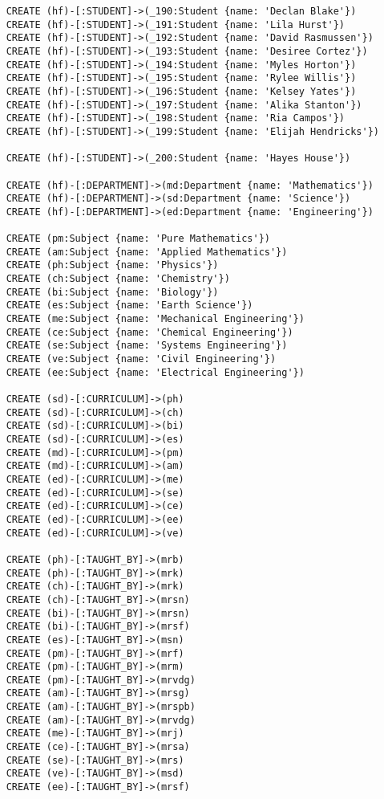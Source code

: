 \begin{lstlisting}
	CREATE (hf)-[:STUDENT]->(_190:Student {name: 'Declan Blake'})
	CREATE (hf)-[:STUDENT]->(_191:Student {name: 'Lila Hurst'})
	CREATE (hf)-[:STUDENT]->(_192:Student {name: 'David Rasmussen'})
	CREATE (hf)-[:STUDENT]->(_193:Student {name: 'Desiree Cortez'})
	CREATE (hf)-[:STUDENT]->(_194:Student {name: 'Myles Horton'})
	CREATE (hf)-[:STUDENT]->(_195:Student {name: 'Rylee Willis'})
	CREATE (hf)-[:STUDENT]->(_196:Student {name: 'Kelsey Yates'})
	CREATE (hf)-[:STUDENT]->(_197:Student {name: 'Alika Stanton'})
	CREATE (hf)-[:STUDENT]->(_198:Student {name: 'Ria Campos'})
	CREATE (hf)-[:STUDENT]->(_199:Student {name: 'Elijah Hendricks'})
	
	CREATE (hf)-[:STUDENT]->(_200:Student {name: 'Hayes House'})
	
	CREATE (hf)-[:DEPARTMENT]->(md:Department {name: 'Mathematics'})
	CREATE (hf)-[:DEPARTMENT]->(sd:Department {name: 'Science'})
	CREATE (hf)-[:DEPARTMENT]->(ed:Department {name: 'Engineering'})
	
	CREATE (pm:Subject {name: 'Pure Mathematics'})
	CREATE (am:Subject {name: 'Applied Mathematics'})
	CREATE (ph:Subject {name: 'Physics'})
	CREATE (ch:Subject {name: 'Chemistry'})
	CREATE (bi:Subject {name: 'Biology'})
	CREATE (es:Subject {name: 'Earth Science'})
	CREATE (me:Subject {name: 'Mechanical Engineering'})
	CREATE (ce:Subject {name: 'Chemical Engineering'})
	CREATE (se:Subject {name: 'Systems Engineering'})
	CREATE (ve:Subject {name: 'Civil Engineering'})
	CREATE (ee:Subject {name: 'Electrical Engineering'})
	
	CREATE (sd)-[:CURRICULUM]->(ph)
	CREATE (sd)-[:CURRICULUM]->(ch)
	CREATE (sd)-[:CURRICULUM]->(bi)
	CREATE (sd)-[:CURRICULUM]->(es)
	CREATE (md)-[:CURRICULUM]->(pm)
	CREATE (md)-[:CURRICULUM]->(am)
	CREATE (ed)-[:CURRICULUM]->(me)
	CREATE (ed)-[:CURRICULUM]->(se)
	CREATE (ed)-[:CURRICULUM]->(ce)
	CREATE (ed)-[:CURRICULUM]->(ee)
	CREATE (ed)-[:CURRICULUM]->(ve)
	
	CREATE (ph)-[:TAUGHT_BY]->(mrb)
	CREATE (ph)-[:TAUGHT_BY]->(mrk)
	CREATE (ch)-[:TAUGHT_BY]->(mrk)
	CREATE (ch)-[:TAUGHT_BY]->(mrsn)
	CREATE (bi)-[:TAUGHT_BY]->(mrsn)
	CREATE (bi)-[:TAUGHT_BY]->(mrsf)
	CREATE (es)-[:TAUGHT_BY]->(msn)
	CREATE (pm)-[:TAUGHT_BY]->(mrf)
	CREATE (pm)-[:TAUGHT_BY]->(mrm)
	CREATE (pm)-[:TAUGHT_BY]->(mrvdg)
	CREATE (am)-[:TAUGHT_BY]->(mrsg)
	CREATE (am)-[:TAUGHT_BY]->(mrspb)
	CREATE (am)-[:TAUGHT_BY]->(mrvdg)
	CREATE (me)-[:TAUGHT_BY]->(mrj)
	CREATE (ce)-[:TAUGHT_BY]->(mrsa)
	CREATE (se)-[:TAUGHT_BY]->(mrs)
	CREATE (ve)-[:TAUGHT_BY]->(msd)
	CREATE (ee)-[:TAUGHT_BY]->(mrsf)
	

\end{lstlisting}
